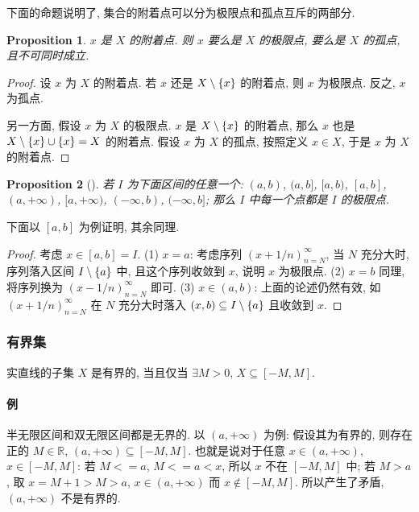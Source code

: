 \documentclass[UTF8]{ctexart}
\theoremstyle{mystyle}
\newtheorem{proposition}{Proposition}[section]
\theoremstyle{myremark}
\theoremstyle{plain}
\newcommand{\R}{\mathbb R}
\DeclarePairedDelimiter\set{\{}{\}}
\begin{document}
下面的命题说明了, 集合的附着点可以分为极限点和孤点互斥的两部分.
\begin{proposition}
    $ x $ 是 $ X $ 的附着点. 则 $ x $ 要么是 $ X $ 的极限点, 要么是 $ X $ 的孤点, 且不可同时成立.
\end{proposition}

\begin{proof}
    设 $ x $ 为 $ X $ 的附着点. 若 $ x $ 还是 $ X \setminus \set{x} $ 的附着点, 则 $ x $ 为极限点. 反之, $ x $ 为孤点.

    另一方面, 假设 $ x $ 为 $ X $ 的极限点. $ x $ 是 $ X \setminus \set{x} $ 的附着点, 那么 $ x $ 也是 $ X \setminus \set{x} \cup \set{x} = X $ 的附着点. 假设 $ x $ 为 $ X $ 的孤点, 按照定义 $ x \in X $, 于是 $ x $ 为 $ X $ 的附着点.
\end{proof}

\begin{proposition}[]
    若 $ I $ 为下面区间的任意一个: $ (a, b) $, $ (a, b] $, $ [a, b) $, $ [a, b] $, $ (a, +\infty) $, $ [a, +\infty) $, $ (-\infty, b) $, $ (-\infty, b] $; 那么 $ I $ 中每一个点都是 $ I $ 的极限点.
\end{proposition}

下面以 $ [a, b] $ 为例证明, 其余同理.

\begin{proof}
    考虑 $ x \in [a, b] = I $. (1) $ x = a $: 考虑序列 $ (x + 1/n)_{n = N}^\infty $, 当 $ N $ 充分大时, 序列落入区间 $ I \setminus \set{a} $ 中, 且这个序列收敛到 $ x $, 说明 $ x $ 为极限点. (2) $ x = b $ 同理, 将序列换为 $ (x - 1/n)_{n = N}^\infty $ 即可. (3) $ x \in (a, b) $: 上面的论述仍然有效, 如 $ (x + 1/n)_{n = N}^\infty $ 在 $ N $ 充分大时落入 $ (x, b) \subseteq I \setminus \set{a} $ 且收敛到 $ x $.
\end{proof}


\subsubsection{有界集}
\begin{definition}[\text{有界}]
    实直线的子集 $ X $ 是有界的, 当且仅当 $ \exists M > 0 $, $ X \subseteq [-M, M] $.
\end{definition}

\paragraph{例}
半无限区间和双无限区间都是无界的. 以 $ (a, +\infty) $ 为例: 假设其为有界的, 则存在正的 $ M \in \R $, $ (a, +\infty) \subseteq [-M, M] $. 也就是说对于任意 $ x \in (a, +\infty) $, $ x \in [-M, M] $: 若 $ M <= a $, $ M <= a < x $, 所以 $ x $ 不在 $ [-M, M] $ 中; 若 $ M > a $, 取 $ x = M + 1 > M > a $, $ x \in (a, +\infty) $ 而  $ x \notin [-M, M] $. 所以产生了矛盾, $ (a, +\infty) $ 不是有界的.
\end{document}
